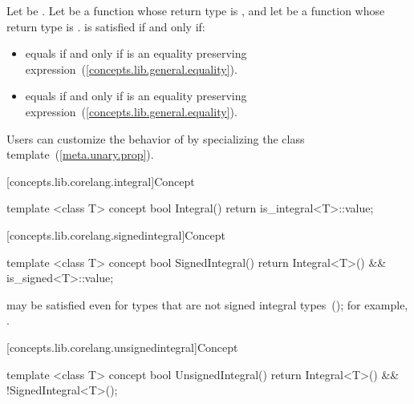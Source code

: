 \begin{itemdescr}
\pnum
Let  be . Let
 be a function whose return type is , and let  be a function
whose return type is .  is satisfied if and only if:
\begin{itemize}
\item {} equals  if and only if
   is an equality preserving
  expression~(\ref{concepts.lib.general.equality}).
\item {} equals  if and only if
   is an equality preserving
  expression~(\ref{concepts.lib.general.equality}).
\end{itemize}

\pnum
\enternote Users can customize the behavior of  by specializing the 
class template~(\ref{meta.unary.prop}).\exitnote

\end{itemdescr}

[concepts.lib.corelang.integral]{Concept }

%
\begin{itemdecl}
template <class T>
concept bool Integral() {
  return is_integral<T>::value;
}
\end{itemdecl}

[concepts.lib.corelang.signedintegral]{Concept }

%
\begin{itemdecl}
template <class T>
concept bool SignedIntegral() {
  return Integral<T>() && is_signed<T>::value;
}
\end{itemdecl}

\begin{itemdescr}
\pnum
\enternote {} may be satisfied even for
types that are not signed integral types~();
for example, .
\exitnote
\end{itemdescr}

[concepts.lib.corelang.unsignedintegral]{Concept }

%
\begin{itemdecl}
template <class T>
concept bool UnsignedIntegral() {
  return Integral<T>() && !SignedIntegral<T>();
}
\end{itemdecl}

